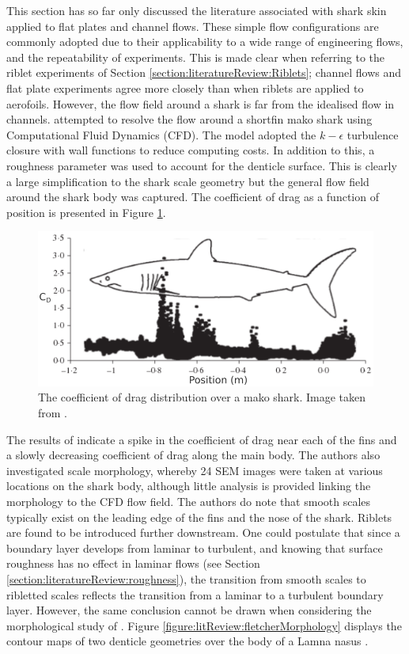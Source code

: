 \documentclass[12pt,oneside,a4paper]{article}
\begin{document}
This section has so far only discussed the literature associated with shark skin applied to flat plates and channel flows. These simple flow configurations are commonly adopted due to their applicability to a wide range of engineering flows, and the repeatability of experiments. This is made clear when referring to the riblet experiments of Section \ref{section:literatureReview:Riblets}; channel flows and flat plate experiments agree more closely than when riblets are applied to aerofoils. However, the flow field around a shark is far from the idealised flow in channels. \cite{diez2015} attempted to resolve the flow around a shortfin mako shark using Computational Fluid Dynamics (CFD). The model adopted the $k-\epsilon$ turbulence closure with wall functions to reduce computing costs. In addition to this, a roughness parameter was used to account for the denticle surface. This is clearly a large simplification to the shark scale geometry but the general flow field around the shark body was captured. The coefficient of drag as a function of position is presented in Figure \ref{figure:litReview:makoSharkFlowField}.
%
\begin{figure}[!t]
\centering
\includegraphics[width=0.8\linewidth]{images/litReview/makoSharkFlowField.png}
\caption{The coefficient of drag distribution over a mako shark. Image taken from \cite{diez2015}.}
\label{figure:litReview:makoSharkFlowField}
\end{figure}
%
 The results of \cite{diez2015} indicate a spike in the coefficient of drag near each of the fins and a slowly decreasing coefficient of drag along the main body. The authors also investigated scale morphology, whereby 24 SEM images were taken at various locations on the shark body, although little analysis is provided linking the morphology to the CFD flow field. The authors do note that smooth scales typically exist on the leading edge of the fins and the nose of the shark. Riblets are found to be introduced further downstream. One could postulate that since a boundary layer develops from laminar to turbulent, and knowing that surface roughness has no effect in laminar flows (see Section \ref{section:literatureReview:roughness}), the transition from smooth scales to ribletted scales reflects the transition from a laminar to a turbulent boundary layer. However, the same conclusion cannot be drawn when considering the morphological study of \cite{fletcher2014phd}. Figure \ref{figure:litReview:fletcherMorphology} displays the contour maps of two denticle geometries over the body of a Lamna nasus \citep{fletcher2014phd}. 
\end{document}
